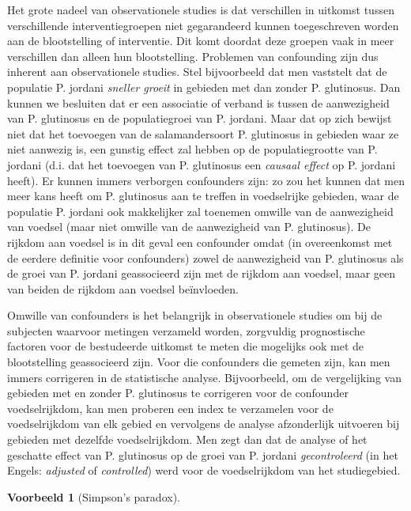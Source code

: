 \documentclass[
  12pt,dutch]{book}
\theoremstyle{definition}
\theoremstyle{definition}
\newtheorem{example}{Voorbeeld}[chapter]
\theoremstyle{definition}
\theoremstyle{definition}
\theoremstyle{remark}
\begin{document}
Het grote nadeel van observationele studies is dat verschillen in uitkomst
tussen verschillende interventiegroepen niet gegarandeerd kunnen
toegeschreven worden aan de blootstelling of interventie. Dit komt doordat deze groepen
vaak in meer verschillen dan alleen hun blootstelling. Problemen van
confounding zijn dus inherent aan observationele studies. Stel bijvoorbeeld
dat men vaststelt dat de populatie P. jordani \emph{sneller groeit} in gebieden met
dan zonder P. glutinosus. Dan kunnen we besluiten dat
er een associatie of verband is tussen de aanwezigheid van P. glutinosus en de populatiegroei van P. jordani. Maar dat op zich
bewijst niet dat het toevoegen van de salamandersoort P. glutinosus in gebieden waar ze niet aanwezig is, een gunstig effect zal hebben op de populatiegrootte van P. jordani (d.i. dat het toevoegen van P. glutinosus een \emph{causaal effect} op P. jordani heeft). Er kunnen immers verborgen confounders zijn: zo zou het kunnen dat men meer kans heeft om P. glutinosus aan te treffen in voedselrijke gebieden, waar de populatie P. jordani ook makkelijker zal toenemen omwille van de aanwezigheid van voedsel (maar niet omwille van de aanwezigheid van P. glutinosus).
De rijkdom aan voedsel is in dit geval
een confounder omdat (in overeenkomst met de eerdere definitie voor
confounders) zowel de aanwezigheid van P. glutinosus als de groei van P. jordani
geassocieerd zijn met de rijkdom aan voedsel, maar geen van beiden de rijkdom aan voedsel beïnvloeden.

Omwille van confounders is het belangrijk in observationele studies om bij
de subjecten waarvoor metingen verzameld worden, zorgvuldig prognostische factoren voor de bestudeerde uitkomst te meten die mogelijks ook met de blootstelling geassocieerd zijn.
Voor die confounders die gemeten zijn, kan men immers corrigeren in de
statistische analyse. Bijvoorbeeld, om de vergelijking van gebieden met en
zonder P. glutinosus te corrigeren voor de confounder voedselrijkdom, kan men proberen een index te verzamelen voor de voedselrijkdom van elk gebied en vervolgens de analyse
afzonderlijk uitvoeren bij gebieden met dezelfde voedselrijkdom.
Men zegt dan dat de analyse of het geschatte
effect van P. glutinosus op de groei van P. jordani \emph{gecontroleerd} (in het Engels:
\emph{adjusted} of \emph{controlled}) werd voor de voedselrijkdom van het studiegebied.

\begin{example}[Simpson's paradox]
\protect\hypertarget{exm:unnamed-chunk-82}{}\label{exm:unnamed-chunk-82}~
\end{example}
\end{document}
